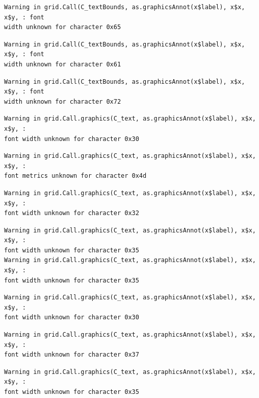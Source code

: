 \documentclass[
  letterpaper,
]{scrbook}
\begin{document}
\begin{verbatim}
Warning in grid.Call(C_textBounds, as.graphicsAnnot(x$label), x$x, x$y, : font
width unknown for character 0x65
\end{verbatim}

\begin{verbatim}
Warning in grid.Call(C_textBounds, as.graphicsAnnot(x$label), x$x, x$y, : font
width unknown for character 0x61
\end{verbatim}

\begin{verbatim}
Warning in grid.Call(C_textBounds, as.graphicsAnnot(x$label), x$x, x$y, : font
width unknown for character 0x72
\end{verbatim}

\begin{verbatim}
Warning in grid.Call.graphics(C_text, as.graphicsAnnot(x$label), x$x, x$y, :
font width unknown for character 0x30
\end{verbatim}

\begin{verbatim}
Warning in grid.Call.graphics(C_text, as.graphicsAnnot(x$label), x$x, x$y, :
font metrics unknown for character 0x4d
\end{verbatim}

\begin{verbatim}
Warning in grid.Call.graphics(C_text, as.graphicsAnnot(x$label), x$x, x$y, :
font width unknown for character 0x32
\end{verbatim}

\begin{verbatim}
Warning in grid.Call.graphics(C_text, as.graphicsAnnot(x$label), x$x, x$y, :
font width unknown for character 0x35
Warning in grid.Call.graphics(C_text, as.graphicsAnnot(x$label), x$x, x$y, :
font width unknown for character 0x35
\end{verbatim}

\begin{verbatim}
Warning in grid.Call.graphics(C_text, as.graphicsAnnot(x$label), x$x, x$y, :
font width unknown for character 0x30
\end{verbatim}

\begin{verbatim}
Warning in grid.Call.graphics(C_text, as.graphicsAnnot(x$label), x$x, x$y, :
font width unknown for character 0x37
\end{verbatim}

\begin{verbatim}
Warning in grid.Call.graphics(C_text, as.graphicsAnnot(x$label), x$x, x$y, :
font width unknown for character 0x35
\end{verbatim}
\end{document}
